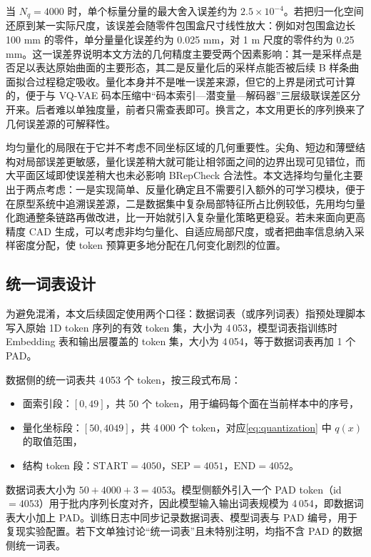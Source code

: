 当 $N_q = 4000$ 时，单个标量分量的最大舍入误差约为 $2.5 \times 10^{-4}$。若把归一化空间还原到某一实际尺度，该误差会随零件包围盒尺寸线性放大：例如对包围盒边长 100 mm 的零件，单分量量化误差约为 0.025 mm，对 1 m 尺度的零件约为 0.25 mm。这一误差界说明本文方法的几何精度主要受两个因素影响：其一是采样点是否足以表达原始曲面的主要形态，其二是反量化后的采样点能否被后续 B 样条曲面拟合过程稳定吸收。量化本身并不是唯一误差来源，但它的上界是闭式可计算的，便于与 VQ-VAE 码本压缩中“码本索引—潜变量—解码器”三层级联误差区分开来。后者难以单独度量，前者只需查表即可。换言之，本文用更长的序列换来了几何误差源的可解释性。

均匀量化的局限在于它并不考虑不同坐标区域的几何重要性。尖角、短边和薄壁结构对局部误差更敏感，量化误差稍大就可能让相邻面之间的边界出现可见错位，而大平面区域即使误差稍大也未必影响 BRepCheck 合法性。本文选择均匀量化主要出于两点考虑：一是实现简单、反量化确定且不需要引入额外的可学习模块，便于在原型系统中追溯误差源，二是数据集中复杂局部特征所占比例较低，先用均匀量化跑通整条链路再做改进，比一开始就引入复杂量化策略更稳妥。若未来面向更高精度 CAD 生成，可以考虑非均匀量化、自适应局部尺度，或者把曲率信息纳入采样密度分配，使 token 预算更多地分配在几何变化剧烈的位置。

\subsection{统一词表设计}

为避免混淆，本文后续固定使用两个口径：数据词表（或序列词表）指预处理脚本写入原始 1D token 序列的有效 token 集，大小为 4\,053，模型词表指训练时 Embedding 表和输出层覆盖的 token 集，大小为 4\,054，等于数据词表再加 1 个 PAD。

数据侧的统一词表共 4\,053 个 token，按三段式布局：

\begin{itemize}
    \item 面索引段：$[0, 49]$，共 50 个 token，用于编码每个面在当前样本中的序号，
    \item 量化坐标段：$[50, 4049]$，共 4\,000 个 token，对应\autoref{eq:quantization} 中 $q(x)$ 的取值范围，
    \item 结构 token 段：$\text{START}=4050$，$\text{SEP}=4051$，$\text{END}=4052$。
\end{itemize}

数据词表大小为 $50 + 4000 + 3 = 4053$。模型侧额外引入一个 PAD token（id $= 4053$）用于批内序列长度对齐，因此模型输入输出词表规模为 4\,054，即数据词表大小加上 PAD。训练日志中同步记录数据词表、模型词表与 PAD 编号，用于复现实验配置。若下文单独讨论“统一词表”且未特别注明，均指不含 PAD 的数据侧统一词表。

